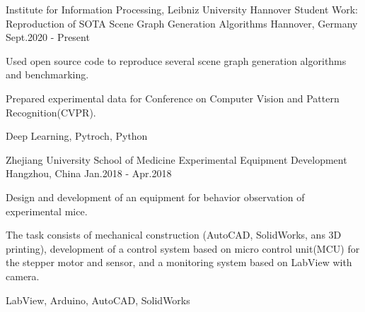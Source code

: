 
\begin{cventries}
	\cventry
	{Institute for Information Processing, Leibniz University Hannover} %
	{Student Work: Reproduction of SOTA Scene Graph Generation Algorithms}
	{Hannover, Germany} %
	{Sept.2020 - Present} %
	{
		\begin{cvitems} %
			\item {Used open source code to reproduce several scene graph generation algorithms and benchmarking.}
			\item {Prepared experimental data for Conference on Computer Vision and Pattern Recognition(CVPR).}
		\end{cvitems}
	}{Deep Learning, Pytroch, Python}

	\cventry
	{Zhejiang University School of Medicine} %
	{Experimental Equipment Development}
	{Hangzhou, China} %
	{Jan.2018 - Apr.2018} %
	{
		\begin{cvitems} %
			\item {Design and development of an equipment for behavior observation of experimental mice. }
			\item {The task consists of mechanical construction (AutoCAD, SolidWorks, ans 3D printing), development of a control system based on micro control unit(MCU) for the stepper motor and sensor, and a monitoring system based on LabView with camera.}
			\end{cvitems}
	}{LabView, Arduino, AutoCAD, SolidWorks}
		
\end{cventries}


